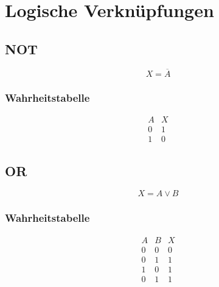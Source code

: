 



\section{Logische Verknüpfungen}

\subsection{NOT}
\[ X = \overline{A} \]
\subsubsection{Wahrheitstabelle}
\begin{table}[h!]
\[ \begin{array}{c|c}
A&X\\
\hline
0&1\\
1&0
\end{array} \]
\end{table}

\subsection{OR}
\[ X = A \lor B \]
\subsubsection{Wahrheitstabelle}
\begin{table}[h!]
\[ \begin{array}{cc|c}
A&B&X\\
\hline
0&0&0\\
0&1&1\\
1&0&1\\
0&1&1\\
\end{array} \]
\end{table}

